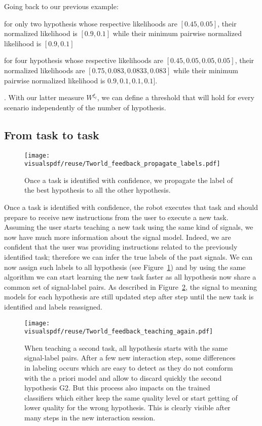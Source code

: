 Going back to our previous example: \begin{inparaenum}[a)] \item for only two hypothesis whose respective likelihoods are $[0.45, 0.05]$, their normalized likelihood is $[0.9,0.1]$ while their minimum pairwise normalized likelihood is $[0.9, 0.1]$ \item for four hypothesis whose respective likelihoods are $[0.45, 0.05, 0.05, 0.05]$, their normalized likelihoods are $[0.75, 0.083, 0.0833, 0.083]$ while their minimum pairwise normalized likelihood is $0.9, 0.1, 0.1, 0.1]$. \end{inparaenum}. With our latter measure $W^{\xi_t}$, we can define a threshold that will hold for every scenario independently of the number of hypothesis. 

\subsection{From task to task}
\label{chapter:lfui:tasttotask}

\begin{figure}[!htbp]
  \centering
  \texttt{[image: \\visualspdf/reuse/Tworld\_feedback\_propagate\_labels.pdf]}
  \caption{Once a task is identified with confidence, we propagate the label of the best hypothesis to all the other hypothesis.}
  \label{fig:TworldPropagate}
\end{figure}

Once a task is identified with confidence, the robot executes that task and should prepare to receive new instructions from the user to execute a new task. Assuming the user starts teaching a new task using the same kind of signals, we now have much more information about the signal model. Indeed, we are confident that the user was providing instructions related to the previously identified task; therefore we can infer the true labels of the past signals. We can now  assign such labels to all hypothesis (see Figure~\ref{fig:TworldPropagate}) and by using the same algorithm we can start learning the new task faster as all hypothesis now share a common set of signal-label pairs. As described in Figure~\ref{fig:TworldReuse}, the signal to meaning models for each hypothesis are still updated step after step until the new task is identified and labels reassigned.


\begin{figure}[!htbp]
  \centering
  \texttt{[image: \\visualspdf/reuse/Tworld\_feedback\_teaching\_again.pdf]}
  \caption{When teaching a second task, all hypothesis starts with the same signal-label pairs. After a few new interaction step, some differences in labeling occurs which are easy to detect as they do not comform with the a priori model and allow to discard quickly the second hypothesis G2. But this process also impacts on the trained classifiers which either keep the same quality level or start getting of lower quality for the wrong hypothesis. This is clearly visible after many steps in the new interaction session.}
  \label{fig:TworldReuse}
\end{figure}

